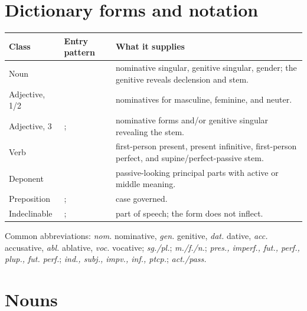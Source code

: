 \chapter{Dictionary forms and notation}


\begin{xltabular}{\linewidth}{@{}P{1.1in}P{2.15in}Y@{}}
  \toprule
  \textbf{Class} & \textbf{Entry pattern} & \textbf{What it supplies} \\
  \midrule\endhead
  Noun &  & nominative singular, genitive singular,
         gender; the genitive reveals declension and stem. \\
  Adjective, 1/2 &  & nominatives for masculine,
         feminine, and neuter. \\
  Adjective, 3 & ;  & nominative forms
         and/or genitive singular revealing the stem. \\
  Verb &  & first-person present, present
         infinitive, first-person perfect, and supine/perfect-passive stem. \\
  Deponent &  & passive-looking principal
         parts with active or middle meaning. \\
  Preposition & ;  & case governed. \\
  Indeclinable & ;  & part of speech; the form
         does not inflect. \\
  \bottomrule
\end{xltabular}

Common abbreviations: \textit{nom.} nominative, \textit{gen.} genitive,
\textit{dat.} dative, \textit{acc.} accusative, \textit{abl.} ablative,
\textit{voc.} vocative; \textit{sg./pl.}; \textit{m./f./n.};
\textit{pres., imperf., fut., perf., plup., fut. perf.};
\textit{ind., subj., impv., inf., ptcp.}; \textit{act./pass.}

\chapter{Nouns}


